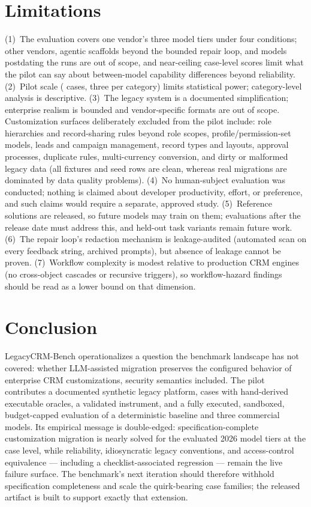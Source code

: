\documentclass[journal]{IEEEtran}
\begin{document}
\section{Limitations}
\label{sec:limitations}
(1)~The evaluation covers one vendor's three model tiers under four conditions; other
vendors, agentic scaffolds beyond the bounded repair loop, and models postdating the runs are
out of scope, and near-ceiling case-level scores limit what the pilot can say about
between-model capability differences beyond reliability. (2)~Pilot scale (\NumCases{} cases, three per category) limits statistical power; category-level
analysis is descriptive. (3)~The legacy system is a documented simplification; enterprise
realism is bounded and vendor-specific formats are out of scope. Customization surfaces
deliberately excluded from the pilot include: role hierarchies and record-sharing rules beyond
role scopes, profile/permission-set models, leads and campaign management, record types and
layouts, approval processes, duplicate rules, multi-currency conversion, and dirty or
malformed legacy data (all fixtures and seed rows are clean, whereas real migrations are
dominated by data quality problems). (4)~No human-subject evaluation was conducted; nothing
is claimed about developer productivity, effort, or preference, and such claims would require
a separate, approved study. (5)~Reference solutions are released, so future models may train
on them; evaluations after the release date must address this, and held-out task variants
remain future work. (6)~The repair loop's redaction mechanism is leakage-audited (automated scan on every
feedback string, archived prompts), but absence of leakage cannot be proven. (7)~Workflow complexity is modest
relative to production CRM engines (no cross-object cascades or recursive triggers), so
workflow-hazard findings should be read as a lower bound on that dimension.

\section{Conclusion}
\label{sec:conclusion}
LegacyCRM-Bench operationalizes a question the benchmark landscape has not covered: whether
LLM-assisted migration preserves the configured behavior of enterprise CRM customizations,
security semantics included. The pilot contributes a documented synthetic legacy platform,
\NumCases{} cases with hand-derived executable oracles, a validated instrument, and a fully
executed, sandboxed, budget-capped evaluation of a deterministic baseline and three
commercial models. Its empirical message is double-edged: specification-complete
customization migration is nearly solved for the evaluated 2026 model tiers at the case
level, while
reliability, idiosyncratic legacy conventions, and access-control equivalence --- including a
checklist-associated regression --- remain the live failure surface. The benchmark's next
iteration should therefore withhold specification completeness and scale the quirk-bearing
case families; the released artifact is built to support exactly that extension.
\end{document}
